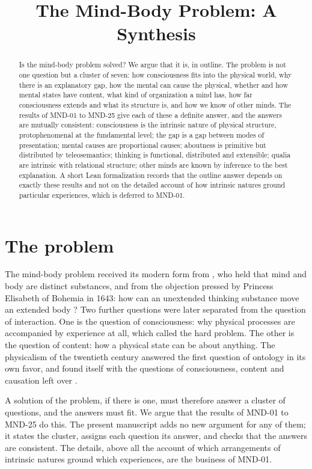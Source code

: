 \documentclass{situationist-preprint}
\title{The Mind-Body Problem: A Synthesis}
\begin{document}
\maketitle

\begin{abstract}
Is the mind-body problem solved? We argue that it is, in outline. The problem is not one question but a cluster of seven: how consciousness fits into the physical world, why there is an explanatory gap, how the mental can cause the physical, whether and how mental states have content, what kind of organization a mind has, how far consciousness extends and what its structure is, and how we know of other minds. The results of MND-01 to MND-25 give each of these a definite answer, and the answers are mutually consistent: consciousness is the intrinsic nature of physical structure, protophenomenal at the fundamental level; the gap is a gap between modes of presentation; mental causes are proportional causes; aboutness is primitive but distributed by teleosemantics; thinking is functional, distributed and extensible; qualia are intrinsic with relational structure; other minds are known by inference to the best explanation. A short Lean formalization records that the outline answer depends on exactly these results and not on the detailed account of how intrinsic natures ground particular experiences, which is deferred to MND-01.
\end{abstract}

\section{The problem}

The mind-body problem received its modern form from \citet{Descartes1641}, who held that mind and body are distinct substances, and from the objection pressed by Princess Elisabeth of Bohemia in 1643: how can an unextended thinking substance move an extended body \citep{Shapiro2007}? Two further questions were later separated from the question of interaction. One is the question of consciousness: why physical processes are accompanied by experience at all, which \citet{Chalmers1995} called the hard problem. The other is the question of content: how a physical state can be about anything. The physicalism of the twentieth century answered the first question of ontology in its own favor, and found itself with the questions of consciousness, content and causation left over \citep{Kim2005}.

A solution of the problem, if there is one, must therefore answer a cluster of questions, and the answers must fit. We argue that the results of MND-01 to MND-25 do this. The present manuscript adds no new argument for any of them; it states the cluster, assigns each question its answer, and checks that the answers are consistent. The details, above all the account of which arrangements of intrinsic natures ground which experiences, are the business of MND-01.
\end{document}
